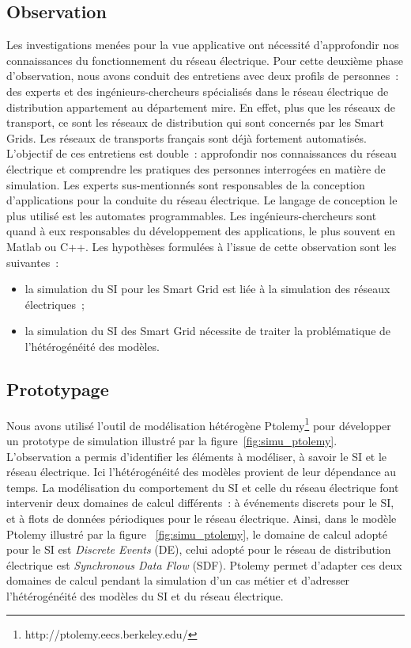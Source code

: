 \subsection{Observation}
Les investigations menées pour la vue applicative ont nécessité d'approfondir nos connaissances du fonctionnement du réseau électrique. Pour cette deuxième phase d'observation, nous avons conduit des entretiens avec deux profils de personnes~: des experts et des ingénieurs-chercheurs spécialisés dans le réseau électrique de distribution  appartement au département \gls{mire}. En effet, plus que les réseaux de transport, ce sont les réseaux de distribution qui sont concernés par les Smart Grids. Les réseaux de transports français sont déjà fortement automatisés. 
L'objectif de ces entretiens est double~: approfondir nos connaissances du réseau électrique et comprendre les pratiques des personnes interrogées en matière de simulation.
Les experts sus-mentionnés sont responsables de la conception d'applications pour la conduite du réseau électrique. Le langage de conception le plus utilisé est les automates programmables. Les ingénieurs-chercheurs sont quand à eux responsables du développement des applications, le plus souvent en Matlab ou C++.
Les hypothèses formulées à l'issue de cette observation sont les suivantes~:
\begin{itemize}
    \item la simulation du SI pour les Smart Grid est liée à la simulation des réseaux électriques~;
	\item la simulation du SI des Smart Grid nécessite de traiter la problématique de l'hétérogénéité des modèles.
\end{itemize}
				
\subsection{Prototypage}
				
Nous avons utilisé l'outil de modélisation hétérogène Ptolemy\footnote{http://ptolemy.eecs.berkeley.edu/} pour développer un prototype de simulation illustré par la figure~\ref{fig:simu_ptolemy}. L'observation a permis d'identifier les éléments à modéliser, à savoir le SI et le réseau électrique. Ici l'hétérogénéité des modèles provient de leur dépendance au temps. La modélisation du comportement du SI et celle du réseau électrique font intervenir deux domaines de calcul différents~: à événements discrets pour le SI, et à flots de données périodiques pour le réseau électrique. 
Ainsi, dans le modèle Ptolemy illustré par la figure ~\ref{fig:simu_ptolemy}, le domaine de calcul adopté pour le SI est \textit{Discrete Events} (DE), celui adopté pour le réseau de distribution électrique est \textit{Synchronous Data Flow} (SDF). Ptolemy permet d'adapter ces deux domaines de calcul pendant la simulation d'un cas métier et d'adresser l'hétérogénéité des modèles du SI et du réseau électrique. 

